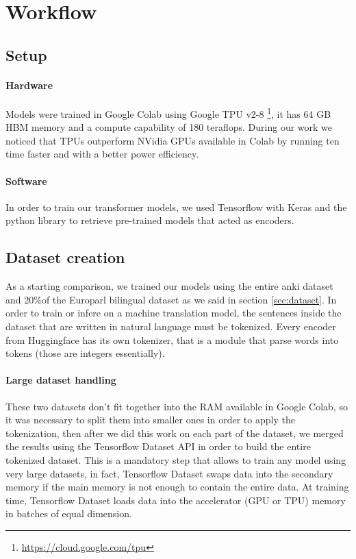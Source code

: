 \section{Workflow}
\subsection{Setup}
\paragraph{Hardware}
Models were trained in Google Colab using Google TPU v2-8 \footnote{\url{https://cloud.google.com/tpu}},  it has 64 GB HBM memory and a compute capability of 180 teraflops. During our work we noticed that TPUs outperform NVidia GPUs available in Colab by running ten time faster and with a better power efficiency.
\paragraph{Software}
In order to train our transformer models, we used Tensorflow with Keras \cite{keras_io} and the \cite{huggingface_co} python library to retrieve pre-trained models that acted as encoders.

\subsection{Dataset creation}
As a starting comparison, we trained our models using the entire anki dataset and 20\%of the Europarl bilingual dataset as we said in section \ref{sec:dataset}. In order to train or infere on a machine translation model, the sentences inside the dataset that are written in natural language must be tokenized. Every encoder from Huggingface has its own tokenizer, that is a module that parse words into tokens (those are integers essentially).

\paragraph{Large dataset handling} These two datasets don't fit together into the RAM available in Google Colab, so it was necessary to split them into smaller ones in order to apply the tokenization, then after we did this work on each part of the dataset, we merged the results using the Tensorflow Dataset API in order to build the entire tokenized dataset. This is a mandatory step that allows to train any model using very large datasets, in fact, Tensorflow Dataset swaps data into the secondary memory if the main memory is not enough to contain the entire data. At training time, Tensorflow Dataset loads data into the accelerator (GPU or TPU) memory in batches of equal dimension. 

